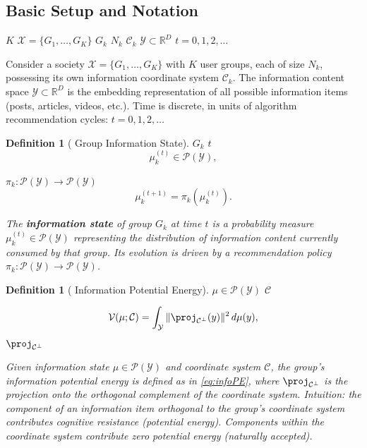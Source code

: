 \documentclass[11pt,a4paper]{article}
\newtheorem{definition}[theorem]{Definition}
\theoremstyle{remark}
\newcommand{\R}{\mathbb{R}}
\newcommand{\Y}{\mathcal{Y}}
\newcommand{\X}{\mathcal{X}}
\newcommand{\CoordSys}{\mathcal{C}}
\newcommand{\InfoPE}{\mathcal{V}}
\begin{document}
\subsection{}

\subsection{Basic Setup and Notation}

 $K$  $\X = \{G_1, \ldots, G_K\}$
 $G_k$  $N_k$ $\CoordSys_k$
 $\Y \subset \R^D$ 
 $t = 0, 1, 2, \ldots$

Consider a society $\X = \{G_1, \ldots, G_K\}$ with $K$ user groups, each of size $N_k$,
possessing its own information coordinate system $\CoordSys_k$. The information content
space $\Y \subset \R^D$ is the embedding representation of all possible information items
(posts, articles, videos, etc.). Time is discrete, in units of algorithm recommendation
cycles: $t = 0, 1, 2, \ldots$

\begin{definition}[ Group Information State]
 $G_k$  $t$ \textbf{}
\[
\mu_k^{(t)} \in \mathcal{P}(\Y),
\]

 $\pi_k: \mathcal{P}(\Y) \to \mathcal{P}(\Y)$ 
\[
\mu_k^{(t+1)} = \pi_k(\mu_k^{(t)}).
\]

The \textbf{information state} of group $G_k$ at time $t$ is a probability measure
$\mu_k^{(t)} \in \mathcal{P}(\Y)$ representing the distribution of information content
currently consumed by that group. Its evolution is driven by a recommendation policy
$\pi_k: \mathcal{P}(\Y) \to \mathcal{P}(\Y)$.
\end{definition}

\begin{definition}[ Information Potential Energy]
 $\mu \in \mathcal{P}(\Y)$  $\CoordSys$

\begin{equation}\label{eq:infoPE}
\InfoPE(\mu; \CoordSys) = \int_{\Y} \|\proj_{\CoordSys^\perp}(y)\|^2 \, d\mu(y),
\end{equation}
 $\proj_{\CoordSys^\perp}$ 



Given information state $\mu \in \mathcal{P}(\Y)$ and coordinate system $\CoordSys$,
the group's information potential energy is defined as in \eqref{eq:infoPE}, where
$\proj_{\CoordSys^\perp}$ is the projection onto the orthogonal complement of the
coordinate system. Intuition: the component of an information item orthogonal to
the group's coordinate system contributes cognitive resistance (potential energy).
Components within the coordinate system contribute zero potential energy (naturally accepted).
\end{definition}
\end{document}
